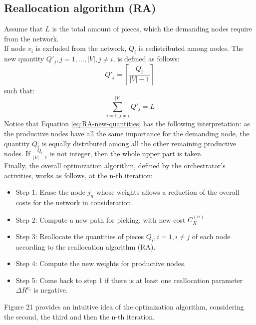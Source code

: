\subsection{Reallocation algorithm (RA)}
Assume that $L$ is the total amount of pieces, which the demanding nodes require from the network.\\
If node $v_i$ is excluded from the network, $Q_i$ is redistributed among nodes. The new quantity $Q\prime _j , j=1, ..., |V|, j \neq i$, is defined as follows:
\begin{equation}
    \label{eq:RA-new-quantities}
    Q\prime _j = \left\lceil \frac{Q_i}{|V| - 1} \right\rceil
\end{equation}
such that:
\begin{equation}
    \label{eq:RA-lot-parity}
    \sum^{|V|}_{j=1,j \neq i} Q\prime _j = L
\end{equation}
Notice that Equation \ref{eq:RA-new-quantities} has the following interpretation: as the productive nodes have all the same importance for the demanding node, the quantity $Q_i$ is equally distributed among all the other remaining productive nodes. If $\frac{Q_i}{|V| - 1}$ is not integer, then the whole upper part is taken.\\
Finally, the overall optimization algorithm, defined by the orchestrator’s activities, works as follows, at the n-th iteration:
\begin{itemize}
    \item Step 1: Erase the node $j_n$ whose weights allows a reduction of the overall costs for the network in consideration. 
    \item Step 2: Compute a new path for picking, with new cost $C_X^{(n)}$
    \item Step 3: Reallocate the quantities of pieces $Q_i , i=1, i \neq j$ of each node according to the reallocation algorithm (RA).
    \item Step 4: Compute the new weights for productive nodes.
    \item Step 5: Come back to step 1 if there is at least one reallocation parameter $\Delta R^{v_i}$ is negative.
\end{itemize}
Figure 21 provides an intuitive idea of the optimization algorithm, considering the second, the third and then the n-th iteration.

